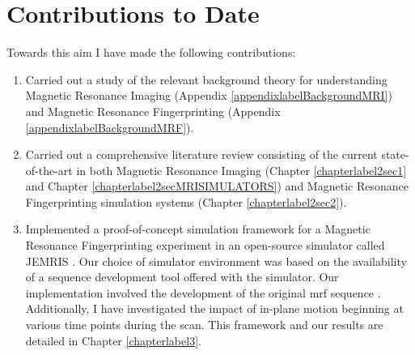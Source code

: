 \section{Contributions to Date}\label{chapterlabel4sec1}

Towards this aim I have made the following contributions:

\begin{enumerate}

	\item Carried out a study of the relevant background theory for understanding Magnetic Resonance Imaging (Appendix \ref{appendixlabelBackgroundMRI}) and Magnetic Resonance Fingerprinting (Appendix \ref{appendixlabelBackgroundMRF}).
	
	\item Carried out a comprehensive literature review consisting of the current state-of-the-art in both Magnetic Resonance Imaging (Chapter \ref{chapterlabel2sec1} and Chapter \ref{chapterlabel2secMRISIMULATORS}) and Magnetic Resonance Fingerprinting simulation systems (Chapter \ref{chapterlabel2sec2}).
	
	\item Implemented a proof-of-concept simulation framework for a Magnetic Resonance Fingerprinting experiment in an open-source simulator called JEMRIS \cite{Stocker2010}.
	Our choice of simulator environment was based on the availability of a sequence development tool offered with the simulator.
	Our implementation involved the development of the original \ac{mrf} sequence \cite{Ma2013}.
	Additionally, I have investigated the impact of in-plane motion beginning at various time points during the scan.
	This framework and our results are detailed in Chapter \ref{chapterlabel3}.
	
\end{enumerate}